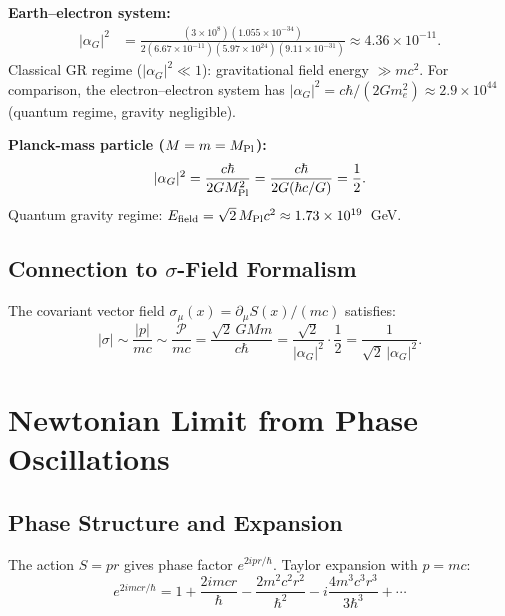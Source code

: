 \documentclass[11pt,a4paper]{article}
\theoremstyle{definition}
\theoremstyle{remark}
\begin{document}
	\textbf{Earth--electron system:}
	\begin{align}
		|\alpha_G|^2 &= \frac{(3\times10^8)(1.055\times10^{-34})}{2(6.67\times10^{-11})(5.97\times10^{24})(9.11\times10^{-31})} \approx 4.36\times10^{-11}.
	\end{align}
	Classical GR regime ($|\alpha_G|^2\ll1$): gravitational field energy $\gg mc^2$.
	For comparison, the electron--electron system has $|\alpha_G|^2 = c\hbar/(2Gm_e^2)\approx 2.9\times10^{44}$ (quantum regime, gravity negligible).
	
	\textbf{Planck-mass particle ($M=m=M_{\rm Pl}$):}
	\begin{equation}
		|\alpha_G|^2 = \frac{c\hbar}{2GM_{\rm Pl}^2} = \frac{c\hbar}{2G(\hbar c/G)} = \frac{1}{2}.
	\end{equation}
	Quantum gravity regime: $E_{\mathrm{field}} = \sqrt{2}\,M_{\rm Pl}c^2\approx 1.73\times10^{19}$~GeV.
	
	\subsection{Connection to $\sigma$-Field Formalism}
	
	The covariant vector field $\sigma_\mu(x)=\partial_\mu S(x)/(mc)$ satisfies:
	\begin{equation}
		|\sigma| \sim \frac{|p|}{mc} \sim \frac{\mathcal{P}}{mc} = \frac{\sqrt{2}\,GMm}{c\hbar} = \frac{\sqrt{2}}{|\alpha_G|^2}\cdot\frac{1}{2} = \frac{1}{\sqrt{2}\,|\alpha_G|^2}.
	\end{equation}
	
	\section{Newtonian Limit from Phase Oscillations}
	
	\subsection{Phase Structure and Expansion}
	
	The action $S=pr$ gives phase factor $e^{2ipr/\hbar}$.  Taylor expansion with $p=mc$:
	\begin{equation}
		e^{2imcr/\hbar} = 1 + \frac{2imcr}{\hbar} - \frac{2m^2c^2r^2}{\hbar^2} - i\frac{4m^3c^3r^3}{3\hbar^3} + \cdots
	\end{equation}
	
\end{document}
